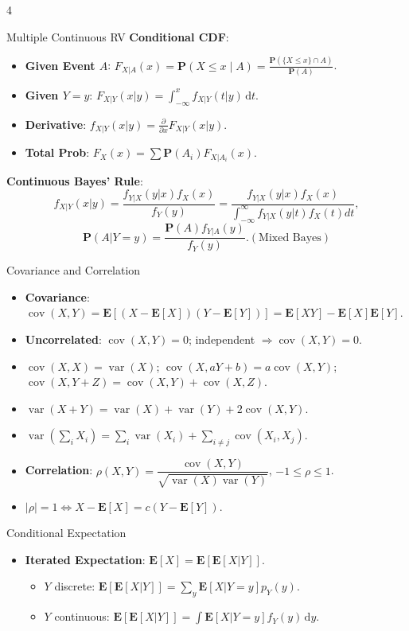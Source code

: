\documentclass[landscape,a4paper]{article}
\newcommand{\PP}{\mathbf{P}}
\newcommand{\EE}{\mathbf{E}}
\newcommand{\var}{\operatorname{var}}
\newcommand{\cov}{\operatorname{cov}}
\begin{document}
\begin{multicols*}{4}
\begin{card}{Multiple Continuous RV}
			\textbf{Conditional CDF}: 
			\begin{itemize}
				\item \textbf{Given Event $A$}: $F_{X|A}(x) = \PP(X \le x \mid A) = \frac{\PP(\{X \le x\} \cap A)}{\PP(A)}$.
				\item \textbf{Given $Y=y$}: $F_{X|Y}(x|y) = \int_{-\infty}^{x} f_{X|Y}(t|y) \,\mathrm dt$.
				\item \textbf{Derivative}: $f_{X|Y}(x|y) = \frac{\partial}{\partial x} F_{X|Y}(x|y)$.
				\item \textbf{Total Prob}: $F_X(x) = \sum \PP(A_i) F_{X|A_i}(x)$.
			\end{itemize}
			\textbf{Continuous Bayes' Rule}:
			\[
			f_{X | Y}(x | y)=\frac{f_{Y | X}(y | x) f_X(x)}{f_Y(y)}=\frac{f_{Y | X}(y | x) f_X(x)}{\int_{-\infty}^{\infty} f_{Y | X}(y | t) f_X(t) d t},
			\]
			\[\PP(A|Y=y) = \frac{\PP(A) f_{Y|A}(y)}{f_Y(y)}. (\text{Mixed Bayes})\]
		\end{card}
		\begin{card}{Covariance and Correlation}
			\begin{itemize}
				\item \textbf{Covariance}: $\cov(X,Y)=\EE[(X-\EE[X])(Y-\EE[Y])]=\EE[XY]-\EE[X]\EE[Y]$.
				\item \textbf{Uncorrelated}: $\cov(X,Y)=0$; independent $\Rightarrow\cov(X,Y)=0$.
				\item $\cov(X,X)=\var(X)$; $\cov(X,aY+b)=a\cov(X,Y)$; $\cov(X,Y+Z)=\cov(X,Y)+\cov(X,Z)$.
				\item $\var(X+Y)=\var(X)+\var(Y)+2\cov(X,Y)$.
				\item $\var(\sum_iX_i)=\sum_i\var(X_i)+\sum_{i\neq j}\cov(X_i,X_j)$.
				\item \textbf{Correlation}: $\rho(X,Y)=\dfrac{\cov(X,Y)}{\sqrt{\var(X)\var(Y)}}$, $-1\le\rho\le1$.
				\item $|\rho|=1\Leftrightarrow X-\EE[X]=c(Y-\EE[Y])$.
			\end{itemize}
		\end{card}
		\begin{card}{Conditional Expectation}
			\begin{itemize}
				\item \textbf{Iterated Expectation}: $\EE[X]=\EE[\EE[X|Y]]$.
				\begin{itemize}
					\item $Y$ discrete: $\EE[\EE[X|Y]]=\sum_y\EE[X|Y=y]p_Y(y)$.
					\item $Y$ continuous: $\EE[\EE[X|Y]]=\int\EE[X|Y=y]f_Y(y)\,\mathrm dy$.

\end{itemize}
\end{itemize}
\end{card}
\end{multicols*}
\end{document}
